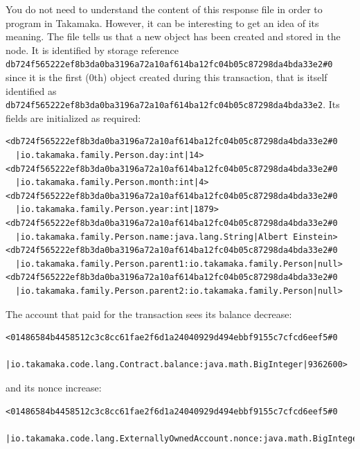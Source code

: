 \documentclass[a4paper,]{book}
\begin{document}
{You do not need to understand the content of this response file in order
to program in Takamaka. However, it can be interesting to get an idea of
its meaning. The file tells us that a new object has been created and
stored in the node. It is identified by storage reference
\texttt{db724f565222ef8b3da0ba3196a72a10af614ba12fc04b05c87298da4bda33e2\#0}
since it is the first (0th) object created during this transaction, that
is itself identified as
\texttt{db724f565222ef8b3da0ba3196a72a10af614ba12fc04b05c87298da4bda33e2}.
Its fields are initialized as required:

\begin{myverbatim}
\begin{verbatim}
<db724f565222ef8b3da0ba3196a72a10af614ba12fc04b05c87298da4bda33e2#0
  |io.takamaka.family.Person.day:int|14>
<db724f565222ef8b3da0ba3196a72a10af614ba12fc04b05c87298da4bda33e2#0
  |io.takamaka.family.Person.month:int|4>
<db724f565222ef8b3da0ba3196a72a10af614ba12fc04b05c87298da4bda33e2#0
  |io.takamaka.family.Person.year:int|1879>
<db724f565222ef8b3da0ba3196a72a10af614ba12fc04b05c87298da4bda33e2#0
  |io.takamaka.family.Person.name:java.lang.String|Albert Einstein>
<db724f565222ef8b3da0ba3196a72a10af614ba12fc04b05c87298da4bda33e2#0
  |io.takamaka.family.Person.parent1:io.takamaka.family.Person|null>
<db724f565222ef8b3da0ba3196a72a10af614ba12fc04b05c87298da4bda33e2#0
  |io.takamaka.family.Person.parent2:io.takamaka.family.Person|null>
\end{verbatim}
\end{myverbatim}

The account that paid for the transaction sees its balance decrease:

\begin{myverbatim}
\begin{verbatim}
<01486584b4458512c3c8cc61fae2f6d1a24040929d494ebbf9155c7cfcd6eef5#0
  |io.takamaka.code.lang.Contract.balance:java.math.BigInteger|9362600>
\end{verbatim}
\end{myverbatim}

and its nonce increase:

\begin{myverbatim}
\begin{verbatim}
<01486584b4458512c3c8cc61fae2f6d1a24040929d494ebbf9155c7cfcd6eef5#0
  |io.takamaka.code.lang.ExternallyOwnedAccount.nonce:java.math.BigInteger|1>
\end{verbatim}
\end{myverbatim}

}
\end{document}
